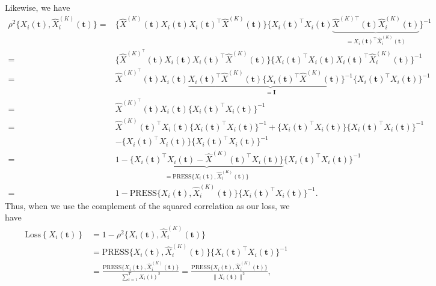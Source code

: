 Likewise, we have 
\begin{align*}
    \rho^2  \bigg\{X_{i}(\mathbf{t}),  \widehat{X}^{(K)}_{i} (\mathbf{t})\bigg\}
    =&
    \bigg\{\widehat{X}^{(K)}(\mathbf{t})X_{i}(\mathbf{t}) X_{i}(\mathbf{t})^\top \widehat{X}^{(K)}(\mathbf{t}) \bigg\}
     \bigg\{X_{i}(\mathbf{t})^\top X_{i}(\mathbf{t}) \underbrace{\widehat{X}^{(K)\top}(\mathbf{t}) \widehat{X}^{(K)}_{i} (\mathbf{t})}_{=X_{i}(\mathbf{t})^\top  \widehat{X}^{(K)}_{i} (\mathbf{t})} \bigg\}^{-1} \\
     =& 
     \bigg\{\widehat{X}^{(K)^\top}(\mathbf{t})X_{i}(\mathbf{t}) X_{i}(\mathbf{t})^\top \widehat{X}^{(K)}(\mathbf{t}) \bigg\}
     \bigg\{X_{i}(\mathbf{t})^\top X_{i}(\mathbf{t}) X_{i}(\mathbf{t})^\top  \widehat{X}^{(K)}_{i} (\mathbf{t}) \bigg\}^{-1} \\
     =&
     \widehat{X}^{(K)^\top}(\mathbf{t})X_{i}(\mathbf{t}) \underbrace{X_{i}(\mathbf{t})^\top \widehat{X}^{(K)}(\mathbf{t})
     \bigg\{X_{i}(\mathbf{t})^\top \widehat{X}^{(K)}(\mathbf{t}) \bigg\}^{-1}}_{=\mathbf{I}}
     \bigg\{X_{i}(\mathbf{t})^\top X_{i}(\mathbf{t})\bigg\}^{-1}  \\
     =& \widehat{X}^{(K)^\top}(\mathbf{t})X_{i}(\mathbf{t})  \bigg\{X_{i}(\mathbf{t})^\top X_{i}(\mathbf{t})\bigg\}^{-1} \\
     =&
     \widehat{X}^{(K)}(\mathbf{t})^\top X_{i}(\mathbf{t})  \bigg\{X_{i}(\mathbf{t})^\top X_{i}(\mathbf{t})\bigg\}^{-1} + 
     \bigg\{X_{i}(\mathbf{t})^\top X_{i}(\mathbf{t})\bigg\}  \bigg\{X_{i}(\mathbf{t})^\top X_{i}(\mathbf{t})\bigg\}^{-1} \\ &- 
     \bigg\{X_{i}(\mathbf{t})^\top X_{i}(\mathbf{t})\bigg\}  \bigg\{X_{i}(\mathbf{t})^\top X_{i}(\mathbf{t})\bigg\}^{-1} \\
     =& 
     1 - \underbrace{\bigg\{ X_{i}(\mathbf{t})^\top X_{i}(\mathbf{t}) - \widehat{X}^{(K)}(\mathbf{t})^\top X_{i}(\mathbf{t}) \bigg\}}_{= \text{PRESS}\bigg\{X_{i}(\mathbf{t}),  \widehat{X}^{(K)}_{i} (\mathbf{t})\bigg\}} \bigg\{X_{i}(\mathbf{t})^\top X_{i}(\mathbf{t})\bigg\}^{-1} \\
     =&
     1 - \text{PRESS}\bigg\{X_{i}(\mathbf{t}),  \widehat{X}^{(K)}_{i} (\mathbf{t})\bigg\} \bigg\{X_{i}(\mathbf{t})^\top X_{i}(\mathbf{t})\bigg\}^{-1}.
\end{align*}
Thus, when we use the complement of the squared correlation as our loss, we have
\begin{align*}
    \text{Loss} \left\{ X_i(\mathbf{t}) \right\}  &= 1 - \rho^2  \bigg\{X_{i}(\mathbf{t}),  \widehat{X}^{(K)}_{i} (\mathbf{t})\bigg\} \\
        &= \text{PRESS}\bigg\{X_{i}(\mathbf{t}),  \widehat{X}^{(K)}_{i} (\mathbf{t})\bigg\} \bigg\{X_{i}(\mathbf{t})^\top X_{i}(\mathbf{t})\bigg\}^{-1} \\
    &=
    \frac{\text{PRESS}\bigg\{X_{i}(\mathbf{t}),  \widehat{X}^{(K)}_{i} (\mathbf{t})\bigg\}}{\sum_{t=1}^T X_i(t)^2} = \frac{\text{PRESS}\bigg\{X_{i}(\mathbf{t}),  \widehat{X}^{(K)}_{i} (\mathbf{t})\bigg\}}{\| X_i(\mathbf{t})\|^2},
\end{align*}
